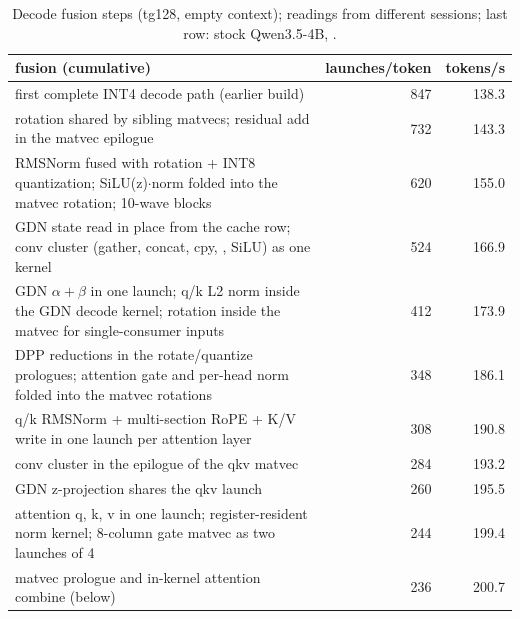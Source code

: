 \documentclass[10.5pt,a4paper]{article}
\newcommand{\tx}[1]{\texttt{\detokenize{#1}}}
\begin{document}
\begin{table}[!ht]
\centering\small
\begin{tabularx}{\linewidth}{@{}>{\raggedright\arraybackslash}Xrr@{}}
\toprule
fusion (cumulative) & launches/token & tokens/s\\
\midrule
first complete INT4 decode path (earlier build) & 847 & 138.3\\
rotation shared by sibling matvecs; residual add in the matvec epilogue & 732 & 143.3\\
RMSNorm fused with rotation + INT8 quantization; SiLU(z)$\cdot$norm folded into the \tx{ssm_out} matvec rotation; 10-wave blocks & 620 & 155.0\\
GDN state read in place from the cache row; conv cluster (gather, concat, cpy, \tx{ssm_conv}, SiLU) as one kernel & 524 & 166.9\\
GDN $\alpha{+}\beta$ in one launch; q/k L2 norm inside the GDN decode kernel; rotation inside the matvec for single-consumer inputs & 412 & 173.9\\
DPP reductions in the rotate/quantize prologues; attention gate and per-head norm folded into the matvec rotations & 348 & 186.1\\
q/k RMSNorm + multi-section RoPE + K/V write in one launch per attention layer & 308 & 190.8\\
conv cluster in the epilogue of the qkv matvec & 284 & 193.2\\
GDN z-projection shares the qkv launch & 260 & 195.5\\
attention q, k, v in one launch; register-resident norm kernel; 8-column gate matvec as two launches of 4 & 244 & 199.4\\
matvec prologue and in-kernel attention combine (below) & 236 & 200.7\\
\bottomrule
\end{tabularx}
\caption{Decode fusion steps (tg128, empty context); readings from different sessions; last row: stock Qwen3.5-4B, \tx{quality}.}
\end{table}
\end{document}
